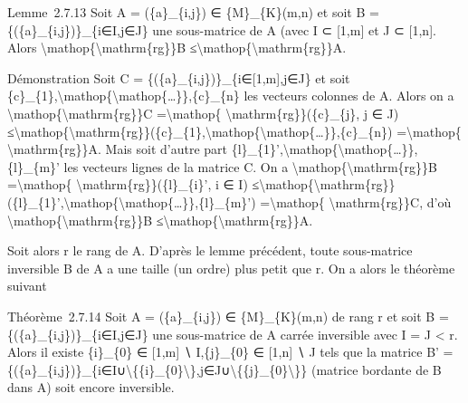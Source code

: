 \documentclass[]{article}
\begin{document}
Lemme~2.7.13 Soit A = (\{a\}\_\{i,j\}) ∈ \{M\}\_\{K\}(m,n) et soit B =
\{(\{a\}\_\{i,j\})\}\_\{i∈I,j∈J\} une sous-matrice de A (avec I ⊂
{[}1,m{]} et J ⊂ {[}1,n{]}. Alors
\textbackslash{}mathop\{\textbackslash{}mathrm\{rg\}\}B
≤\textbackslash{}mathop\{\textbackslash{}mathrm\{rg\}\}A.

Démonstration Soit C = \{(\{a\}\_\{i,j\})\}\_\{i∈{[}1,m{]},j∈J\} et soit
\{c\}\_\{1\},\textbackslash{}mathop\{\textbackslash{}mathop\{\ldots{}\}\},\{c\}\_\{n\}
les vecteurs colonnes de A. Alors on a
\textbackslash{}mathop\{\textbackslash{}mathrm\{rg\}\}C
=\textbackslash{}mathop\{ \textbackslash{}mathrm\{rg\}\}(\{c\}\_\{j\}, j
∈ J)
≤\textbackslash{}mathop\{\textbackslash{}mathrm\{rg\}\}(\{c\}\_\{1\},\textbackslash{}mathop\{\textbackslash{}mathop\{\ldots{}\}\},\{c\}\_\{n\})
=\textbackslash{}mathop\{ \textbackslash{}mathrm\{rg\}\}A. Mais soit
d'autre part
\{l\}\_\{1\}',\textbackslash{}mathop\{\textbackslash{}mathop\{\ldots{}\}\},\{l\}\_\{m\}'
les vecteurs lignes de la matrice C. On a
\textbackslash{}mathop\{\textbackslash{}mathrm\{rg\}\}B
=\textbackslash{}mathop\{ \textbackslash{}mathrm\{rg\}\}(\{l\}\_\{i\}',
i ∈ I)
≤\textbackslash{}mathop\{\textbackslash{}mathrm\{rg\}\}(\{l\}\_\{1\}',\textbackslash{}mathop\{\textbackslash{}mathop\{\ldots{}\}\},\{l\}\_\{m\}')
=\textbackslash{}mathop\{ \textbackslash{}mathrm\{rg\}\}C, d'où
\textbackslash{}mathop\{\textbackslash{}mathrm\{rg\}\}B
≤\textbackslash{}mathop\{\textbackslash{}mathrm\{rg\}\}A.

Soit alors r le rang de A. D'après le lemme précédent, toute
sous-matrice inversible B de A a une taille (un ordre) plus petit que r.
On a alors le théorème suivant

Théorème~2.7.14 Soit A = (\{a\}\_\{i,j\}) ∈ \{M\}\_\{K\}(m,n) de rang r
et soit B = \{(\{a\}\_\{i,j\})\}\_\{i∈I,j∈J\} une sous-matrice de A
carrée inversible avec \textbar{}I\textbar{} = \textbar{}J\textbar{}
\textless{} r. Alors il existe \{i\}\_\{0\} ∈ {[}1,m{]} ∖ I,\{j\}\_\{0\}
∈ {[}1,n{]} ∖ J tels que la matrice B' =
\{(\{a\}\_\{i,j\})\}\_\{i∈I∪\textbackslash{}\{\{i\}\_\{0\}\textbackslash{}\},j∈J∪\textbackslash{}\{\{j\}\_\{0\}\textbackslash{}\}\}
(matrice bordante de B dans A) soit encore inversible.
\end{document}

